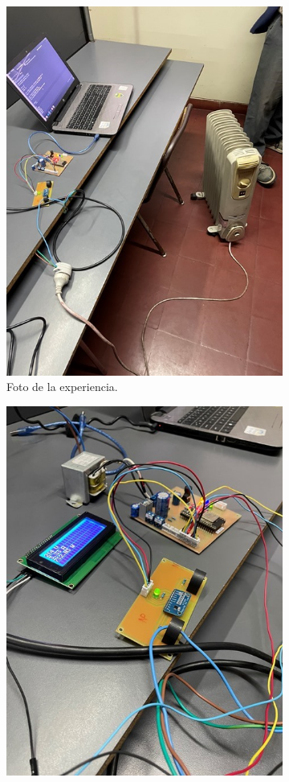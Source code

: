 \begin{figure}[H]

\begin{subfigure}{0.5\textwidth}
\includegraphics[width=0.9\linewidth]{informes/IMG_8604.jpg} 
\caption{Foto de la experiencia.}
\end{subfigure}
\begin{subfigure}{0.5\textwidth}
\includegraphics[width=0.9\linewidth]{informes/IMG_8605.jpg}

\end{subfigure}
\end{figure}
